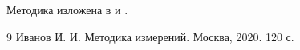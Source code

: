 Методика изложена в \cite{ivanov} и \cite{petrov}. %

\begin{thebibliography}{9}
   Иванов И. И. Методика измерений. Москва, 2020. 120 с.
\end{thebibliography}
